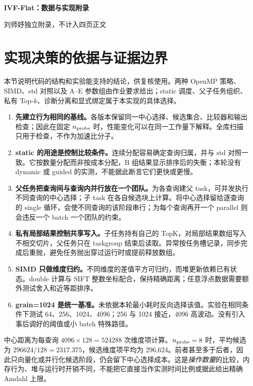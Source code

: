 

\begin{center}
{\LARGE\bfseries IVF-Flat：数据与实现附录}\par\vspace{4pt}
刘师妤\qquad 独立附录，不计入四页正文
\end{center}
\section{实现决策的依据与证据边界}
本节说明代码的结构和实验能支持的结论，供复核使用。两种 OpenMP 策略、SIMD、std 对照以及 A--E 参数组由作业要求给出；static 调度、父子任务组织、私有 Top-$k$、诊断分离和显式绑定属于本实现的具体选择。
\begin{enumerate}
\item \textbf{先建立行为相同的基线。}各版本保留同一中心选择、候选集合、比较器和输出检查；因此在固定 $n_{\rm probe}$ 时，性能变化可以在同一工作量下解释。全库扫描只用于检查，不作为加速比分子。
\item \textbf{static 的用途是控制比较条件。}连续分配容易确定查询归属，并与 std 对照一致。它按数量分配而非按成本分配，B 组结果显示排序后的失衡；本轮没有 dynamic 或 guided 的实测，不能据此断言它们更快或更慢。
\item \textbf{父任务把查询间与查询内并行放在一个团队。}为各查询建父 task，可并发执行不同查询的中心选择；子 task 在各自候选块上计算。将中心选择留给逐查询的 single 循环，会使不同查询的该阶段串行；为每个查询再开一个 parallel 则会违反一个 batch 一个团队的约束。
\item \textbf{私有局部结果控制共享写入。}子任务持有自己的 TopK，对局部结果数组写入不相交切片，父任务只在 taskgroup 结束后读取。异常按任务槽记录，同步完成后重抛，避免任务抛出穿过运行时或提前释放数组。
\item \textbf{SIMD 只做维度归约。}不同维度的差值平方可归约，而堆更新依赖已有状态。double 计算与 SIFT 整数坐标配合，保持精确距离；任意浮点数据需要额外测试舍入和近等距排序。
\item \textbf{grain=1024 是统一基准。}未依据本轮最小耗时反向选择该值。实验在相同条件下测试 64、256、1024、4096；256 与 1024 接近，4096 高波动。没有引入事后调好的阈值或小 batch 特殊路径。
\end{enumerate}

中心距离为每查询 $4096\times128=524288$ 次维度项计算。$n_{\rm probe}=8$ 时，平均候选为 $296624/128=2317.375$，候选维度项平均为 296,624。前者甚至多于后者，因此只向量化或并行化候选阶段，仍会留下中心选择成本。这是\emph{操作数量}的比较，内存行为、堆与运行时开销不同，不能把它直接当作实测时间比例或据此给出精确 Amdahl 上限。

